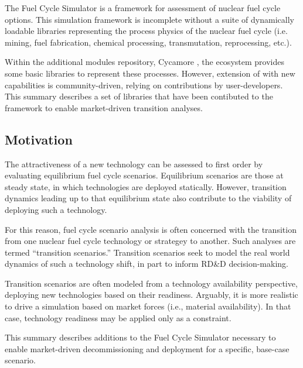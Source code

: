 
The \Cyclus Fuel Cycle Simulator \cite{carlsen_cyclus_2014} is a framework for 
assessment of nuclear fuel cycle options. This simulation framework is 
incomplete without a suite of dynamically loadable libraries representing the 
process physics of the nuclear fuel cycle (i.e. mining, fuel fabrication, 
chemical processing, transmutation, reprocessing, etc.).  

Within the additional modules repository, Cycamore 
\cite{carlsen_cycamore_2014}, the \Cyclus ecosystem provides some basic 
libraries to represent these processes. However, extension of \Cyclus with new 
capabilities is community-driven, relying on contributions by user-developers.  
This summary describes a set of libraries that have been contibuted to the 
\Cyclus framework to enable market-driven transition analyses. 

\subsection{Motivation}

The attractiveness of a new technology can be assessed to first order by 
evaluating equilibrium fuel cycle scenarios. Equilibrium scenarios are those 
at steady state, in which technologies are deployed statically. However, 
transition dynamics leading up to that equilibrium state also contribute to 
the viability of deploying such a technology.  

For this reason, fuel cycle scenario analysis is often concerned with the 
transition from one nuclear fuel cycle technology or strategey to another. Such 
analyses are termed ``transition scenarios.''  Transition scenarios seek to 
model the real world dynamics of such a technology shift, in part to inform 
RD\&D decision-making. 

Transition scenarios are often modeled from a technology availability 
perspective, deploying new technologies based on their readiness.  Arguably, it 
is more realistic to drive a simulation based on market forces (i.e., material 
availability). In that case, technology readiness may be applied only as a 
constraint. 

This summary describes additions to the \Cyclus Fuel Cycle Simulator necessary 
to enable market-driven decommissioning and deployment for a specific, 
base-case scenario.  

